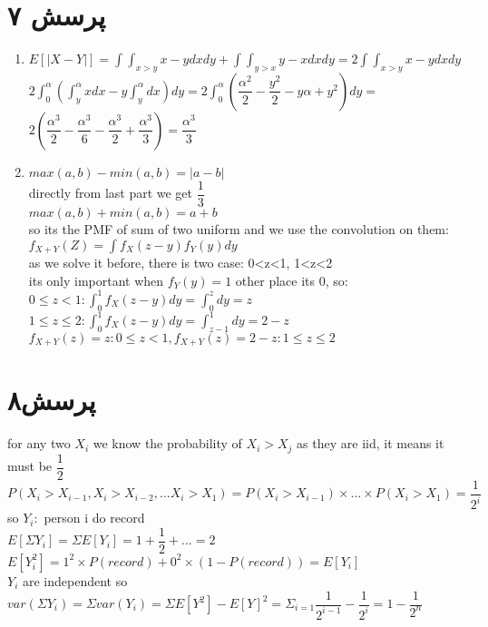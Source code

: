 \documentclass[a4paper]{article}
\begin{document}
\section*{پرسش ۷}
\begin{latin}
\begin{enumerate}
\item{}
$E[|X-Y|] = \int \int_{x>y} x-y dxdy +\int \int_{y>x} y-x dxdy = 2\int \int_{x>y} x-y dxdy $\\
$2\int_0^\alpha (\int_y^\alpha xdx - y\int^\alpha_y dx)dy= 2\int_0^\alpha (\dfrac{\alpha^2}{2} - \dfrac{y^2}{2} - y\alpha + y^2)dy = $\\
$2 (\dfrac{\alpha^3}{2}-\dfrac{\alpha^3}{6} - \dfrac{\alpha^3}{2} + \dfrac{\alpha^3}{3})= \dfrac{\alpha^3}{3}$\\

\item{}
$max(a,b) - min(a,b) = |a-b|$\\
directly from last part we get $\dfrac{1}{3}$\\

$max(a,b) + min(a,b) = a+b$\\
so its the PMF of sum of two uniform and we use the convolution on them:
$f_{X+Y}(Z)=\int f_X(z-y)f_Y(y)dy$\\
as we solve it before, there is two case: 0<z<1, 1<z<2\\
its only important when $f_Y(y)=1$ other place its 0, so:
$0\leq z<1: \int_0^1 f_X(z-y)dy = \int_0^z dy = z$\\
$1\leq z\leq 2: \int_0^1 f_X(z-y)dy = \int_{z-1}^1 dy = 2-z$\\
$f_{X+Y}(z) = z : 0\leq z<1, f_{X+Y}(z)=2-z: 1\leq z\leq 2$

\end{enumerate}
\end{latin}
\pagebreak
\section*{پرسش۸}
\begin{latin}
for any two $X_i$ we know the probability of $X_i > X_j$ as they are iid, it means it must be $\dfrac{1}{2}$\\
$ P(X_i > X_{i-1}, X_i > X_{i-2},... X_i > X_1) = P(X_i>X_{i-1})\times ... \times P(X_i > X_1) = \dfrac{1}{2^i}$\\
so $Y_i:$ person i do record \\ $E[\Sigma Y_i] = \Sigma E[Y_i]= 1 + \dfrac{1}{2} + ... = 2$\\
$E[Y_i^2] = 1^2\times P(record) + 0^2\times(1-P(record)) = E[Y_i]$\\
$Y_i$ are independent so $var(\Sigma Y_i) = \Sigma var(Y_i) = \Sigma E[Y^2] - E[Y]^2 = \Sigma_{i=1} \dfrac{1}{2^{i-1}} - \dfrac{1}{2^i} = 1 - \dfrac{1}{2^n}$
\end{latin}
\end{document}

